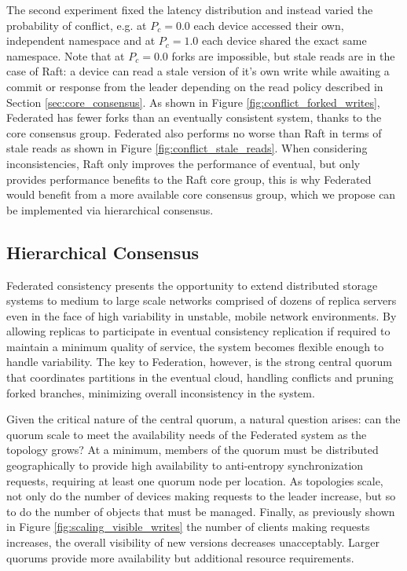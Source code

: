 \documentclass{article}
\begin{document}
The second experiment fixed the latency distribution and instead varied the probability of conflict, e.g. at $P_c=0.0$ each device accessed their own, independent namespace and at $P_c=1.0$ each device shared the exact same namespace. Note that at $P_c=0.0$ forks are impossible, but stale reads are in the case of Raft: a device can read a stale version of it's own write while awaiting a commit or response from the leader depending on the read policy described in Section \ref{sec:core_consensus}. As shown in Figure \ref{fig:conflict_forked_writes}, Federated has fewer forks than an eventually consistent system, thanks to the core consensus group. Federated also performs no worse than Raft in terms of stale reads as shown in Figure \ref{fig:conflict_stale_reads}. When considering inconsistencies, Raft only improves the performance of eventual, but only provides performance benefits to the Raft core group, this is why Federated would benefit from a more available core consensus group, which we propose can be implemented via hierarchical consensus.

\subsection{Hierarchical Consensus}
\label{sec:hierarchical}

Federated consistency presents the opportunity to extend distributed storage systems to medium to large scale networks comprised of dozens of replica servers even in the face of high variability in unstable, mobile network environments. By allowing replicas to participate in eventual consistency replication if required to maintain a minimum quality of service, the system becomes flexible enough to handle variability. The key to Federation, however, is the strong central quorum that coordinates partitions in the eventual cloud, handling conflicts and pruning forked branches, minimizing overall inconsistency in the system.

Given the critical nature of the central quorum, a natural question arises: can the quorum scale to meet the availability needs of the Federated system as the topology grows? At a minimum, members of the quorum must be distributed geographically to provide high availability to anti-entropy synchronization requests, requiring at least one quorum node per location. As topologies scale, not only do the number of devices making requests to the leader increase, but so to do the number of objects that must be managed. Finally, as previously shown in Figure \ref{fig:scaling_visible_writes} the number of clients making requests increases, the overall visibility of new versions decreases unacceptably. Larger quorums provide more availability but additional resource requirements.
\end{document}
